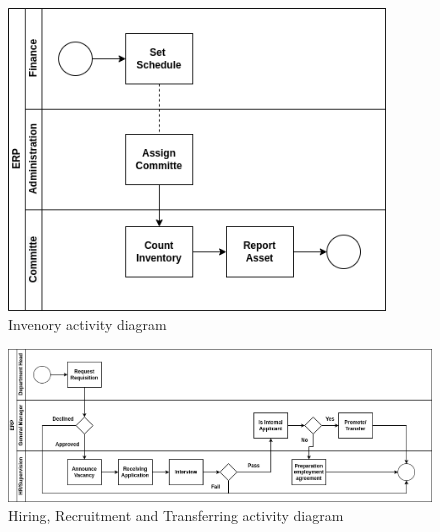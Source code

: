 
\begin{figure}[!h]
\label{login_activity_diagram}
\center
\includegraphics[width=10cm,keepaspectratio]{activity_diagrams/manage_inventory_activity_diagram.drawio.png}
\caption{Invenory activity diagram}
\end{figure}

\begin{figure}[!h]
\label{loan_activity_diagram}
\center
\includegraphics[width=15cm,keepaspectratio]{activity_diagrams/acquisition_activity_diagram.drawio.png}
\caption{Hiring, Recruitment and Transferring activity diagram}
\end{figure}


